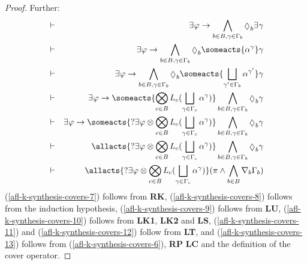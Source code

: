 \begin{proof}
Further:
\begin{eqnarray}
    &\proves& \somerefs \phi \implies \bigwedge_{\agentB \in \agentsB, \gamma \in \Gamma_\agentB} \possible_\agentB \somerefs \gamma\label{afl-k-synthesis-covers-7}\\
    &\proves& \somerefs \phi \implies \bigwedge_{\agentB \in \agentsB, \gamma \in \Gamma_\agentB} \possible_\agentB \someacts{\alpha^{\gamma}} \gamma\label{afl-k-synthesis-covers-8}\\
    &\proves& \somerefs \phi \implies \bigwedge_{\agentB \in \agentsB, \gamma \in \Gamma_\agentB} \possible_\agentB \someacts{\bigchoice_{\gamma' \in \Gamma_\agentB} \alpha^{\gamma'}} \gamma\label{afl-k-synthesis-covers-9}\\
    &\proves& \somerefs \phi \implies \someacts{\bigcompose_{\agentC \in \agentsB} \learns_\agentC (\bigchoice_{\gamma \in \Gamma_\agentC} \alpha^\gamma)} \bigwedge_{\agentB \in \agentsB, \gamma \in \Gamma_\agentB} \possible_\agentB \gamma\label{afl-k-synthesis-covers-10}\\
    &\proves& \somerefs \phi \implies \someacts{\test{\somerefs \phi} \compose \bigcompose_{\agentC \in \agentsB} \learns_\agentC (\bigchoice_{\gamma \in \Gamma_\agentC} \alpha^\gamma)} \bigwedge_{\agentB \in \agentsB, \gamma \in \Gamma_\agentB} \possible_\agentB \gamma\label{afl-k-synthesis-covers-11}\\
    &\proves& \allacts{\test{\somerefs \phi} \compose \bigcompose_{\agentC \in \agentsB} \learns_\agentC (\bigchoice_{\gamma \in \Gamma_\agentC} \alpha^\gamma)} \bigwedge_{\agentB \in \agentsB, \gamma \in \Gamma_\agentB} \possible_\agentB \gamma\label{afl-k-synthesis-covers-12}\\
    &\proves& \allacts{\test{\somerefs \phi} \compose \bigcompose_{\agentC \in \agentsB} \learns_\agentC (\bigchoice_{\gamma \in \Gamma_\agentC} \alpha^\gamma)} (\pi \land \bigwedge_{\agentB \in \agentsB} \coversB \Gamma_\agentB)\label{afl-k-synthesis-covers-13}
\end{eqnarray}
(\ref{afl-k-synthesis-covers-7}) follows from {\bf RK},
(\ref{afl-k-synthesis-covers-8}) follows from the induction hypothesis,
(\ref{afl-k-synthesis-covers-9}) follows from {\bf LU},
(\ref{afl-k-synthesis-covers-10}) follows from {\bf LK1}, {\bf LK2} and {\bf LS},
(\ref{afl-k-synthesis-covers-11}) and (\ref{afl-k-synthesis-covers-12}) follow from {\bf LT}, and
(\ref{afl-k-synthesis-covers-13}) follows from (\ref{afl-k-synthesis-covers-6}), {\bf RP} {\bf LC} and the definition of the cover operator.


\end{proof}
